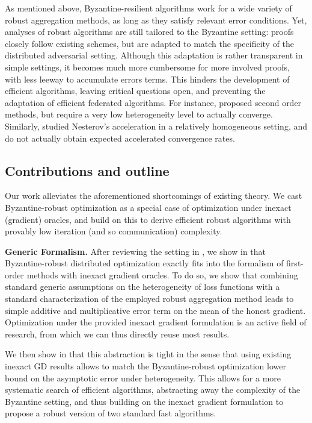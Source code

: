 \documentclass{article}
\theoremstyle{plain}
\theoremstyle{definition}
\theoremstyle{remark}
\begin{document}
As mentioned above, Byzantine-resilient algorithms work for a wide variety of robust aggregation methods, as long as they satisfy relevant error conditions. Yet, analyses of robust algorithms are still tailored to the Byzantine setting: proofs closely follow existing schemes, but are adapted to match the specificity of the distributed adversarial setting. Although this adaptation is rather transparent in simple settings, it becomes much more cumbersome for more involved proofs, with less leeway to accumulate errors terms. This hinders the development of efficient algorithms, leaving critical questions open, and preventing the adaptation of efficient federated algorithms. For instance, \citet{ghosh2020distributed} proposed second order methods, but require a very low heterogeneity level to actually converge. Similarly, \citet{xu2025nesterov} studied Nesterov's acceleration in a relatively homogeneous setting, and do not actually obtain expected accelerated convergence rates. %





 





\subsection*{Contributions and outline}

Our work alleviates the aforementioned shortcomings of existing theory. We cast Byzantine-robust optimization as a special case of optimization under inexact (gradient) oracles, and build on this to derive efficient robust algorithms with provably low iteration (and so communication) complexity.  

\textbf{Generic Formalism.} After reviewing the setting in ,  we show in  that Byzantine-robust distributed optimization exactly fits into the formalism of first-order methods with inexact gradient oracles. To do so,
we show that combining standard generic assumptions on the heterogeneity of loss functions with a standard characterization of the employed robust aggregation method leads to simple additive and multiplicative error term on the mean of the honest gradient.
Optimization under the provided inexact gradient formulation is an active field of research, from which we can thus directly reuse most results. 

We then show in  that this abstraction is tight in the sense that using existing inexact GD results allows to match the Byzantine-robust optimization lower bound on the asymptotic error under heterogeneity. %
This allows for a more systematic search of efficient algorithms, abstracting away the complexity of the Byzantine setting, and 
thus building on the inexact gradient formulation to propose a robust version of two standard fast algorithms.
\end{document}
